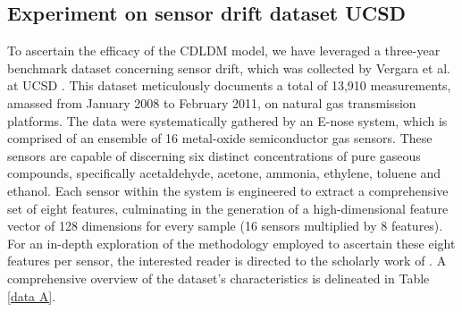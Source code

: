 \documentclass[a4paper]{cas-sc}
\begin{document}
\subsection{Experiment on sensor drift dataset UCSD}\label{EA}

To ascertain the efficacy of the CDLDM model, we have leveraged a three-year benchmark dataset concerning sensor drift, which was collected by Vergara et al. at UCSD \cite{UCSD}.
This dataset meticulously documents a total of 13,910 measurements, amassed from January 2008 to February 2011, on natural gas transmission platforms. The data were systematically gathered by an E-nose system, which is comprised of an ensemble of 16 metal-oxide semiconductor gas sensors. These sensors are capable of discerning six distinct concentrations of pure gaseous compounds, specifically acetaldehyde, acetone, ammonia, ethylene, toluene and ethanol.
Each sensor within the system is engineered to extract a comprehensive set of eight features, culminating in the generation of a high-dimensional feature vector of 128 dimensions for every sample (16 sensors multiplied by 8 features). For an in-depth exploration of the methodology employed to ascertain these eight features per sensor, the interested reader is directed to the scholarly work of \cite{UCSD}. A comprehensive overview of the dataset's characteristics is delineated in Table \ref{data A}.
\end{document}
